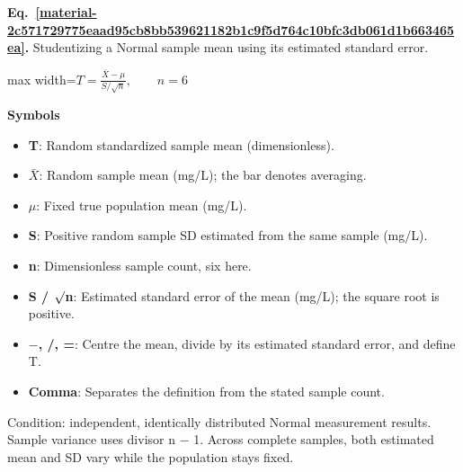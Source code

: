 \documentclass[11pt,a4paper]{article}
\begin{document}
\par\medskip
\begin{samepage}
\label{material-2c571729775eaad95cb8bb539621182b1c9f5d764c10bfc3db061d1b663465ea}
\noindent\textbf{Eq.~\ref*{material-2c571729775eaad95cb8bb539621182b1c9f5d764c10bfc3db061d1b663465ea}.} Studentizing a Normal sample mean using its estimated standard error.\par\nopagebreak
\begin{center}\begin{adjustbox}{max width=\linewidth}$\displaystyle T=\frac{\bar X-\mu}{S/\sqrt n},\qquad n=6$\end{adjustbox}\end{center}

\par\noindent\textbf{Symbols}

\begin{itemize}\setlength{\itemsep}{1pt}\setlength{\parsep}{0pt}
\item \textbf{T}: Random standardized sample mean (dimensionless).
\item \textbf{\ensuremath{\bar{X}}}: Random sample mean (mg/L); the bar denotes averaging.
\item \textbf{\ensuremath{\mu}}: Fixed true population mean (mg/L).
\item \textbf{S}: Positive random sample SD estimated from the same sample (mg/L).
\item \textbf{n}: Dimensionless sample count, six here.
\item \textbf{S / \ensuremath{\sqrt{\vphantom{x}}}n}: Estimated standard error of the mean (mg/L); the square root is positive.
\item \textbf{\ensuremath{-}, /, =}: Centre the mean, divide by its estimated standard error, and define T.
\item \textbf{Comma}: Separates the definition from the stated sample count.
\end{itemize}

Condition: independent, identically distributed Normal measurement results. Sample variance uses divisor n \ensuremath{-} 1. Across complete samples, both estimated mean and SD vary while the population stays fixed.

\end{samepage}
\medskip
\end{document}
